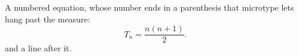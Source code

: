 A numbered equation, whose number ends in a parenthesis that microtype
lets hang past the measure:
\begin{equation}
  T_n = \frac{n(n+1)}{2}.
\end{equation}
and a line after it.
